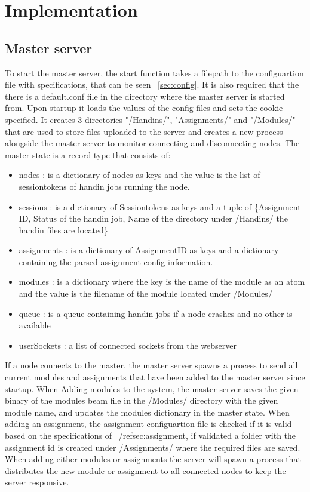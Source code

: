 \section{Implementation}
\subsection{Master server}
To start the master server, the start function takes a filepath to the configuartion file with specifications, that can be seen ~\ref{sec:config}. It is also required that the there is a default.conf file in the directory where the master server is started from. Upon startup it loads the values of the config files and sets the cookie specified. It creates 3 directories "/Handins/", "Assignments/" and "/Modules/" that are used to store files uploaded to the server and creates a new process alongside the master server to monitor connecting and disconnecting nodes. The master state is a record type that consists of:
\begin{itemize}
\item nodes : is a dictionary of nodes as keys and the value is the list of sessiontokens of handin jobs running the node.
\item sessions : is a dictionary of Sessiontokens as keys and a tuple of \{Assignment ID, Status of the handin job, Name of the directory under /Handins/ the handin files are located\}
\item assignments : is a dictionary of AssignmentID as keys and a dictionary containing the parsed assignment config information.
\item modules : is a dictionary where the key is the name of the module as an atom and the value is the filename of the module located under /Modules/
\item queue : is a queue containing handin jobs if a node crashes and no other is available
\item userSockets : a list of connected sockets from the webserver
\end{itemize}
If a node connects to the master, the master server spawns a process to send all current modules and assignments that have been added to the master server since startup. When Adding modules to the system, the master server saves the given binary of the modules beam file in the /Modules/ directory with the given module name, and updates the modules dictionary in the master state. When adding an assignment, the assignment configuartion file is checked if it is valid based on the specifications of ~/ref{sec:assignment}, if validated a folder with the assignment id is created under /Assignments/ where the required files are saved. When adding either modules or assignments the server will spawn a process that distributes the new module or assignment to all connected nodes to keep the server responsive.

